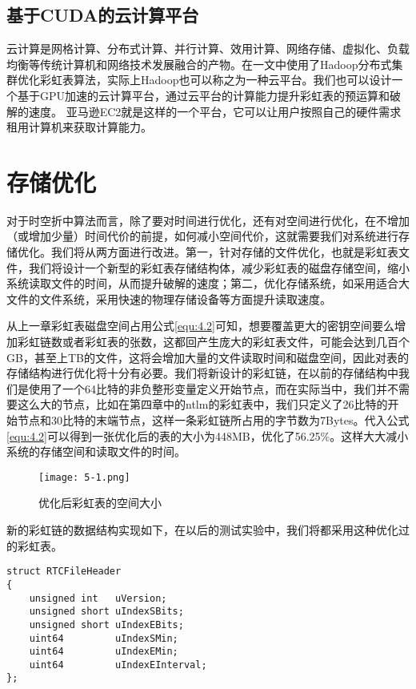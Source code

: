 \subsection{基于CUDA的云计算平台}
云计算是网格计算、分布式计算、并行计算、效用计算、网络存储、虚拟化、负载均衡等传统计算机和网络技术发展融合的产物。在\cite{word}一文中使用了Hadoop分布式集群优化彩虹表算法，实际上Hadoop也可以称之为一种云平台。我们也可以设计一个基于GPU加速的云计算平台，通过云平台的计算能力提升彩虹表的预运算和破解的速度。
亚马逊EC2就是这样的一个平台，它可以让用户按照自己的硬件需求租用计算机来获取计算能力。
\section{存储优化}
对于时空折中算法而言，除了要对时间进行优化，还有对空间进行优化，在不增加（或增加少量）时间代价的前提，如何减小空间代价，这就需要我们对系统进行存储优化。我们将从两方面进行改进。第一，针对存储的文件优化，也就是彩虹表文件，我们将设计一个新型的彩虹表存储结构体，减少彩虹表的磁盘存储空间，缩小系统读取文件的时间，从而提升破解的速度；第二，优化存储系统，如采用适合大文件的文件系统，采用快速的物理存储设备等方面提升读取速度。

从上一章彩虹表磁盘空间占用公式\eqref{equ:4.2}可知，想要覆盖更大的密钥空间要么增加彩虹链数或者彩虹表的张数，这都回产生庞大的彩虹表文件，可能会达到几百个GB，甚至上TB的文件，这将会增加大量的文件读取时间和磁盘空间，因此对表的存储结构进行优化将十分有必要。我们将新设计的彩虹链，在以前的存储结构中我们是使用了一个64比特的非负整形变量定义开始节点，而在实际当中，我们并不需要这么大的节点，比如在第四章中的ntlm的彩虹表中，我们只定义了26比特的开始节点和30比特的末端节点，这样一条彩虹链所占用的字节数为7Bytes。代入公式\eqref{equ:4.2}可以得到一张优化后的表的大小为448MB，优化了56.25\%。这样大大减小系统的存储空间和读取文件的时间。
\begin{figure}[!ht]
\centering
\texttt{[image: 5-1.png]}
\caption{优化后彩虹表的空间大小}
\label{fig:5.1}
\end{figure}

新的彩虹链的数据结构实现如下，在以后的测试实验中，我们将都采用这种优化过的彩虹表。
\begin{lstlisting}
struct RTCFileHeader
{
    unsigned int   uVersion;    
    unsigned short uIndexSBits; 
    unsigned short uIndexEBits; 
    uint64         uIndexSMin;
    uint64         uIndexEMin;
    uint64         uIndexEInterval;
};
\end{lstlisting}

